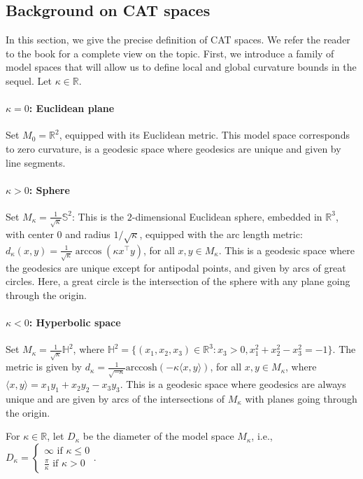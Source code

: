 \documentclass[10pt,a4paper]{article}
\theoremstyle{plain}
\theoremstyle{definition}
\theoremstyle{remark}
\newcommand{\R}{\mathbb{R}}
\newcommand{\Sp}{\mathbb{S}}
\newcommand{\DS}{\displaystyle}
\begin{document}
\subsection{Background on CAT spaces}\label{cat}


In this section, we give the precise definition of CAT spaces. We refer the reader to the book \cite{Alexandrovgeom} for a complete view on the topic. First, we introduce a family of model spaces that will allow us to define local and global curvature bounds in the sequel. Let $\kappa\in\R$. 

\paragraph{$\kappa=0$: Euclidean plane} 
Set $M_0=\R^2$, equipped with its Euclidean metric. This model space corresponds to zero curvature, is a geodesic space where geodesics are unique and given by line segments. 

\paragraph{$\kappa>0$: Sphere}
Set $M_\kappa=\frac{1}{\sqrt\kappa}\Sp^2$: This is the $2$-dimensional Euclidean sphere, embedded in $\R^3$, with center $0$ and radius $1/\sqrt\kappa$, equipped with the arc length metric: $d_\kappa(x,y)=\frac{1}{\sqrt\kappa}\arccos(\kappa x^\top y)$, for all $x,y\in M_\kappa$. This is a geodesic space where the geodesics are unique except for antipodal points, and given by arcs of great circles. Here, a great circle is the intersection of the sphere with any plane going through the origin. 

\paragraph{$\kappa<0$: Hyperbolic space}
Set $M_\kappa=\frac{1}{\sqrt\kappa}\mathbb H^2$, where $\mathbb H^2=\{(x_1,x_2,x_3)\in\R^3:x_3>0, x_1^2+x_2^2-x_3^2=-1\}$. The metric is given by $d_\kappa=\frac{1}{\sqrt{-\kappa}}\textrm{arccosh}(-\kappa\langle x,y\rangle)$, for all $x,y\in M_\kappa$, where $\langle x,y\rangle=x_1y_1+x_2y_2-x_3y_3$. This is a geodesic space where geodesics are always unique and are given by arcs of the intersections of $M_\kappa$ with planes going through the origin. 

\vspace{4mm} 
For $\kappa\in\R$, let $D_\kappa$ be the diameter of the model space $M_\kappa$, i.e., 
$\DS D_\kappa=\begin{cases} \infty \mbox{ if } \kappa\leq 0 \\ \frac{\pi}{\kappa} \mbox{ if } \kappa>0\end{cases}$.
\end{document}

